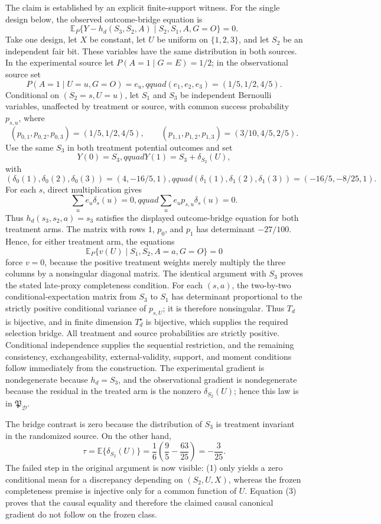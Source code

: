 The claim is established by an explicit finite-support witness. For the single design below, the observed outcome-bridge equation is
\[
 \mathbb E_P\{Y-h_d(S_3,S_2,A)\mid S_2,S_1,A,G=O\}=0. \tag{1}
\]
Take one design, let \(X\) be constant, let \(U\) be uniform on \(\{1,2,3\}\), and let \(S_2\) be an independent fair bit.  These variables have the same distribution in both sources.  In the experimental source let \(P(A=1\mid G=E)=1/2\); in the observational source set
\[
 P(A=1\mid U=u,G=O)=e_u,qquad (e_1,e_2,e_3)=(1/5,1/2,4/5).
\]
Conditional on \((S_2=s,U=u)\), let \(S_1\) and \(S_3\) be independent Bernoulli variables, unaffected by treatment or source, with common success probability \(p_{s,u}\), where
\[
 (p_{0,1},p_{0,2},p_{0,3})=(1/5,1/2,4/5),\qquad
 (p_{1,1},p_{1,2},p_{1,3})=(3/10,4/5,2/5).
\]
Use the same \(S_3\) in both treatment potential outcomes and set
\[
 Y(0)=S_3,qquad Y(1)=S_3+\delta_{S_2}(U),
\]
with
\[
 (\delta_0(1),\delta_0(2),\delta_0(3))=(4,-16/5,1),qquad
 (\delta_1(1),\delta_1(2),\delta_1(3))=(-16/5,-8/25,1).
\]
For each \(s\), direct multiplication gives
\[
 \sum_u e_u\delta_s(u)=0,qquad
 \sum_u e_up_{s,u}\delta_s(u)=0. \tag{2}
\]
Thus \(h_d(s_3,s_2,a)=s_3\) satisfies the displayed outcome-bridge equation for both treatment arms.  The matrix with rows \(1\), \(p_0\), and \(p_1\) has determinant \(-27/100\).  Hence, for either treatment arm, the equations
\[
 \mathbb E_P\{v(U)\mid S_1,S_2,A=a,G=O\}=0
\]
force \(v=0\), because the positive treatment weights merely multiply the three columns by a nonsingular diagonal matrix.  The identical argument with \(S_3\) proves the stated late-proxy completeness condition.  For each \((s,a)\), the two-by-two conditional-expectation matrix from \(S_3\) to \(S_1\) has determinant proportional to the strictly positive conditional variance of \(p_{s,U}\); it is therefore nonsingular.  Thus \(T_d\) is bijective, and in finite dimension \(T_d^\star\) is bijective, which supplies the required selection bridge.  All treatment and source probabilities are strictly positive.  Conditional independence supplies the sequential restriction, and the remaining consistency, exchangeability, external-validity, support, and moment conditions follow immediately from the construction.  The experimental gradient is nondegenerate because \(h_d=S_3\), and the observational gradient is nondegenerate because the residual in the treated arm is the nonzero \(\delta_{S_2}(U)\); hence this law is in \(\mathfrak P_{\mathcal D}\).

The bridge contrast is zero because the distribution of \(S_3\) is treatment invariant in the randomized source.  On the other hand,
\[
 \tau=\mathbb E\{\delta_{S_2}(U)\}
 =\frac16\left(\frac95-\frac{63}{25}\right)=-\frac3{25}. \tag{3}
\]
The failed step in the original argument is now visible: (1) only yields a zero conditional mean for a discrepancy depending on \((S_2,U,X)\), whereas the frozen completeness premise is injective only for a common function of \(U\).  Equation (3) proves that the causal equality and therefore the claimed causal canonical gradient do not follow on the frozen class.